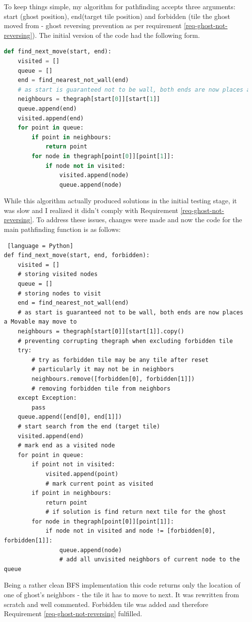 \documentclass[11pt,a4paper]{report}
\begin{document}
				To keep things simple, my algorithm for pathfinding accepts three arguments: start (ghost position), end(target tile position) and forbidden (tile the ghost moved from - ghost reversing prevention as per requirement \ref{req-ghost-not-reversing}).
				The initial version of the code had the following form.
				\begin{lstlisting}[language=Python]
def find_next_move(start, end):
	visited = []
	queue = []
	end = find_nearest_not_wall(end)
	# as start is guaranteed not to be wall, both ends are now places a Movable may move to
	neighbours = thegraph[start[0]][start[1]]
	queue.append(end)
	visited.append(end)
	for point in queue:
		if point in neighbours:
			return point
		for node in thegraph[point[0]][point[1]]:
			if node not in visited:
				visited.append(node)
				queue.append(node)
				\end{lstlisting}
				While this algorithm actually produced solutions in the initial testing stage, it was slow and I realized it didn't comply with Requirement \ref{req-ghost-not-reversing}. To address these issues, changes were made and now the code for the main pathfinding function is as follows:
				\begin{lstlisting} [language = Python]
def find_next_move(start, end, forbidden):
	visited = []
	# storing visited nodes
	queue = []
	# storing nodes to visit
	end = find_nearest_not_wall(end)
	# as start is guaranteed not to be wall, both ends are now places a Movable may move to
	neighbours = thegraph[start[0]][start[1]].copy()
	# preventing corrupting thegraph when excluding forbidden tile
	try:
		# try as forbidden tile may be any tile after reset
		# particularly it may not be in neighbors
		neighbours.remove([forbidden[0], forbidden[1]])
		# removing forbidden tile from neighbors
	except Exception:
		pass
	queue.append([end[0], end[1]])
	# start search from the end (target tile)
	visited.append(end)
	# mark end as a visited node
	for point in queue:
		if point not in visited:
			visited.append(point)
			# mark current point as visited
		if point in neighbours:
			return point
			# if solution is find return next tile for the ghost
		for node in thegraph[point[0]][point[1]]:
			if node not in visited and node != [forbidden[0], forbidden[1]]:
				queue.append(node)
				# add all unvisited neighbors of current node to the queue
				\end{lstlisting}
Being a rather clean BFS implementation this code returns only the location of one of ghost's neighbors - the tile it has to move to next. It was rewritten from scratch and well commented. Forbidden tile was added and therefore Requirement \ref{req-ghost-not-reversing} fulfilled.
\end{document}
